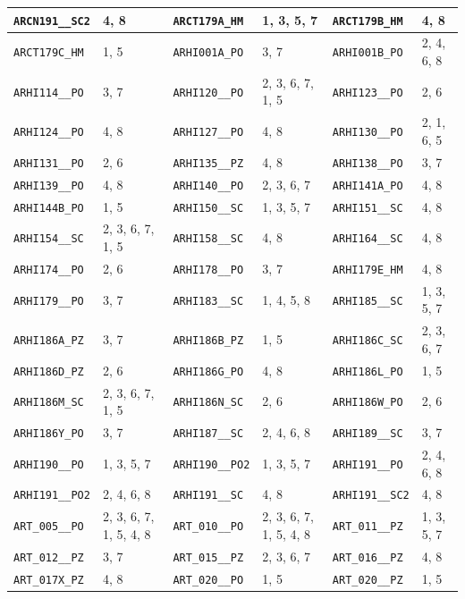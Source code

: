 \begin{longtable}{|l|l||l|l||l|l|}
    \verb|ARCN191__SC2| & 4, 8 & \verb|ARCT179A_HM| & 1, 3, 5, 7 & \verb|ARCT179B_HM| & 4, 8\\\hline
    \verb|ARCT179C_HM| & 1, 5 & \verb|ARHI001A_PO| & 3, 7 & \verb|ARHI001B_PO| & 2, 4, 6, 8\\\hline
    \verb|ARHI114__PO| & 3, 7 & \verb|ARHI120__PO| & 2, 3, 6, 7, 1, 5 & \verb|ARHI123__PO| & 2, 6\\\hline
    \verb|ARHI124__PO| & 4, 8 & \verb|ARHI127__PO| & 4, 8 & \verb|ARHI130__PO| & 2, 1, 6, 5\\\hline
    \verb|ARHI131__PO| & 2, 6 & \verb|ARHI135__PZ| & 4, 8 & \verb|ARHI138__PO| & 3, 7\\\hline
    \verb|ARHI139__PO| & 4, 8 & \verb|ARHI140__PO| & 2, 3, 6, 7 & \verb|ARHI141A_PO| & 4, 8\\\hline
    \verb|ARHI144B_PO| & 1, 5 & \verb|ARHI150__SC| & 1, 3, 5, 7 & \verb|ARHI151__SC| & 4, 8\\\hline
    \verb|ARHI154__SC| & 2, 3, 6, 7, 1, 5 & \verb|ARHI158__SC| & 4, 8 & \verb|ARHI164__SC| & 4, 8\\\hline
    \verb|ARHI174__PO| & 2, 6 & \verb|ARHI178__PO| & 3, 7 & \verb|ARHI179E_HM| & 4, 8\\\hline
    \verb|ARHI179__PO| & 3, 7 & \verb|ARHI183__SC| & 1, 4, 5, 8 & \verb|ARHI185__SC| & 1, 3, 5, 7\\\hline
    \verb|ARHI186A_PZ| & 3, 7 & \verb|ARHI186B_PZ| & 1, 5 & \verb|ARHI186C_SC| & 2, 3, 6, 7\\\hline
    \verb|ARHI186D_PZ| & 2, 6 & \verb|ARHI186G_PO| & 4, 8 & \verb|ARHI186L_PO| & 1, 5\\\hline
    \verb|ARHI186M_SC| & 2, 3, 6, 7, 1, 5 & \verb|ARHI186N_SC| & 2, 6 & \verb|ARHI186W_PO| & 2, 6\\\hline
    \verb|ARHI186Y_PO| & 3, 7 & \verb|ARHI187__SC| & 2, 4, 6, 8 & \verb|ARHI189__SC| & 3, 7\\\hline
    \verb|ARHI190__PO| & 1, 3, 5, 7 & \verb|ARHI190__PO2| & 1, 3, 5, 7 & \verb|ARHI191__PO| & 2, 4, 6, 8\\\hline
    \verb|ARHI191__PO2| & 2, 4, 6, 8 & \verb|ARHI191__SC| & 4, 8 & \verb|ARHI191__SC2| & 4, 8\\\hline
    \verb|ART_005__PO| & 2, 3, 6, 7, 1, 5, 4, 8 & \verb|ART_010__PO| & 2, 3, 6, 7, 1, 5, 4, 8 & \verb|ART_011__PZ| & 1, 3, 5, 7\\\hline
    \verb|ART_012__PZ| & 3, 7 & \verb|ART_015__PZ| & 2, 3, 6, 7 & \verb|ART_016__PZ| & 4, 8\\\hline
    \verb|ART_017X_PZ| & 4, 8 & \verb|ART_020__PO| & 1, 5 & \verb|ART_020__PZ| & 1, 5\\\hline

\end{longtable}
